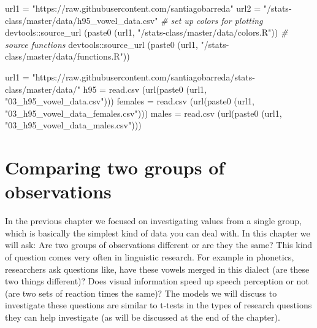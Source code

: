 \documentclass[
]{book}
\newenvironment{Shaded}{\begin{snugshade}}{\end{snugshade}}
\newcommand{\CommentTok}[1]{\textcolor[rgb]{0.56,0.35,0.01}{\textit{#1}}}
\newcommand{\FunctionTok}[1]{\textcolor[rgb]{0.00,0.00,0.00}{#1}}
\newcommand{\NormalTok}[1]{#1}
\newcommand{\OtherTok}[1]{\textcolor[rgb]{0.56,0.35,0.01}{#1}}
\newcommand{\SpecialCharTok}[1]{\textcolor[rgb]{0.00,0.00,0.00}{#1}}
\newcommand{\StringTok}[1]{\textcolor[rgb]{0.31,0.60,0.02}{#1}}
\begin{document}
\begin{Shaded}
\begin{Highlighting}[]
\NormalTok{url1 }\OtherTok{=} \StringTok{"https://raw.githubusercontent.com/santiagobarreda"}
\NormalTok{url2 }\OtherTok{=} \StringTok{"/stats{-}class/master/data/h95\_vowel\_data.csv"}
\CommentTok{\# set up colors for plotting}
\NormalTok{devtools}\SpecialCharTok{::}\FunctionTok{source\_url}\NormalTok{ (}\FunctionTok{paste0}\NormalTok{ (url1, }\StringTok{"/stats{-}class/master/data/colors.R"}\NormalTok{))}
\CommentTok{\# source functions}
\NormalTok{devtools}\SpecialCharTok{::}\FunctionTok{source\_url}\NormalTok{ (}\FunctionTok{paste0}\NormalTok{ (url1, }\StringTok{"/stats{-}class/master/data/functions.R"}\NormalTok{))}

\NormalTok{url1 }\OtherTok{=} \StringTok{"https://raw.githubusercontent.com/santiagobarreda/stats{-}class/master/data/"}
\NormalTok{h95 }\OtherTok{=} \FunctionTok{read.csv}\NormalTok{ (}\FunctionTok{url}\NormalTok{(}\FunctionTok{paste0}\NormalTok{ (url1, }\StringTok{"03\_h95\_vowel\_data.csv"}\NormalTok{)))}
\NormalTok{females }\OtherTok{=} \FunctionTok{read.csv}\NormalTok{ (}\FunctionTok{url}\NormalTok{(}\FunctionTok{paste0}\NormalTok{ (url1, }\StringTok{"03\_h95\_vowel\_data\_females.csv"}\NormalTok{)))}
\NormalTok{males }\OtherTok{=} \FunctionTok{read.csv}\NormalTok{ (}\FunctionTok{url}\NormalTok{(}\FunctionTok{paste0}\NormalTok{ (url1, }\StringTok{"03\_h95\_vowel\_data\_males.csv"}\NormalTok{)))}
\end{Highlighting}
\end{Shaded}

\hypertarget{comparing-two-groups-of-observations}{%
\chapter{Comparing two groups of observations}\label{comparing-two-groups-of-observations}}

In the previous chapter we focused on investigating values from a single group, which is basically the simplest kind of data you can deal with. In this chapter we will ask: Are two groups of observations different or are they the same? This kind of question comes very often in linguistic research. For example in phonetics, researchers ask questions like, have these vowels merged in this dialect (are these two things different)? Does visual information speed up speech perception or not (are two sets of reaction times the same)? The models we will discuss to investigate these questions are similar to t-tests in the types of research questions they can help investigate (as will be discussed at the end of the chapter).
\end{document}
